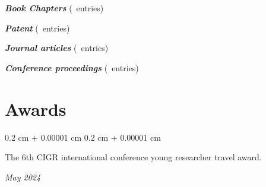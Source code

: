 \documentclass[10pt, a4paper]{article}
\newcounter{bookchapcount}
\newcounter{journalcount}
\newcounter{confcount}
\newcounter{patentcount}
\newenvironment{onecolentry}{
    \begin{adjustwidth}{
        0.2 cm + 0.00001 cm
    }{
        0.2 cm + 0.00001 cm
    }
}{
    \end{adjustwidth}
} %
\newenvironment{twocolentry}[2][]{
    \onecolentry
    \def\secondColumn{#2}
    \setcolumnwidth{\fill, 4.5 cm}
    \begin{paracol}{2}
}{
    \switchcolumn \raggedleft \secondColumn
    \end{paracol}
    \endonecolentry
} %
\let\hrefWithoutArrow\href
\renewcommand{\href}[2]{\hrefWithoutArrow{#1}{\ifthenelse{\equal{#2}{}}{ }{#2 }\raisebox{.15ex}{\footnotesize \faExternalLink*}}}
\begin{document}
        \vspace{0.10 cm}
        \textbf{\textit{Book Chapters}} (\thebookchapcount\ entries)
        \printbibliography[type=incollection, heading=none] %

        \vspace{0.10 cm}
        \textbf{\textit{Patent}} (\thepatentcount\ entries)
        \printbibliography[type=patent, heading=none] %

        \vspace{0.10 cm}
        \textbf{\textit{Journal articles}} (\thejournalcount\ entries)
        \printbibliography[type=article, heading=none] %

        \vspace{0.10 cm}
        \textbf{\textit{Conference proceedings}} (\theconfcount\ entries)
        \printbibliography[type=report, heading=none] %
        







    \section{Awards}

        \begin{twocolentry}{
            \textit{May 2024}}
            The 6th CIGR international conference young researcher travel award.
        \end{twocolentry}

        \vspace{0.10 cm}
\end{document}
